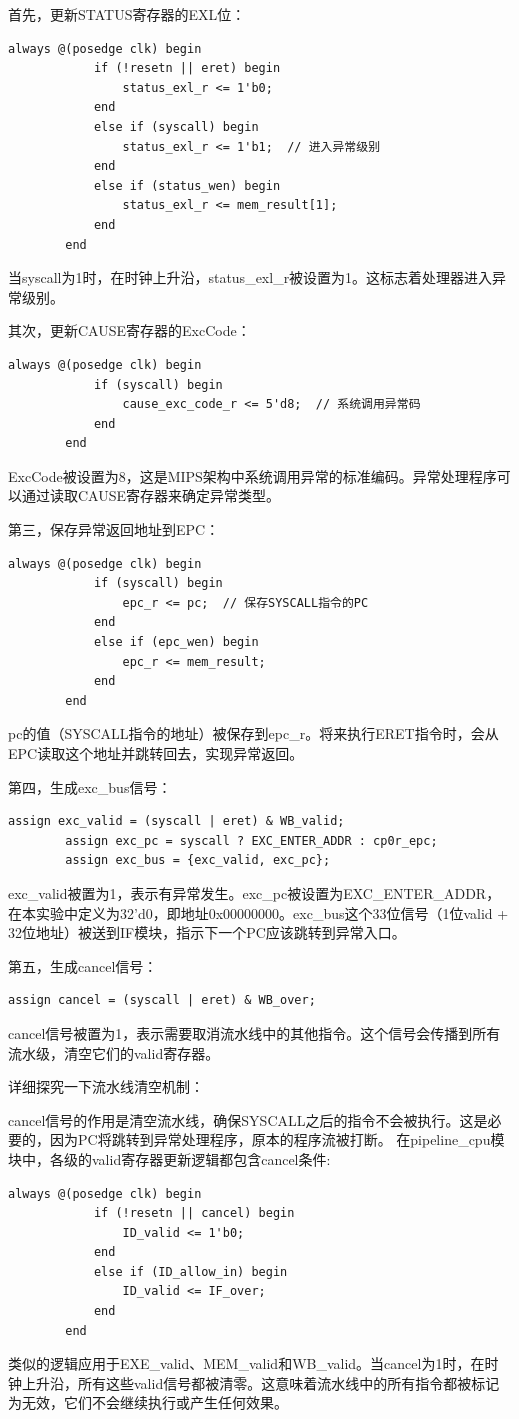 \documentclass[a4paper]{article}
\begin{document}
	首先，更新STATUS寄存器的EXL位：
	\begin{lstlisting}[caption={WB-exl}]
		always @(posedge clk) begin
			if (!resetn || eret) begin
				status_exl_r <= 1'b0;
			end
			else if (syscall) begin
				status_exl_r <= 1'b1;  // 进入异常级别
			end
			else if (status_wen) begin
				status_exl_r <= mem_result[1];
			end
		end
	\end{lstlisting}
	当syscall为1时，在时钟上升沿，status\_exl\_r被设置为1。这标志着处理器进入异常级别。
	
	其次，更新CAUSE寄存器的ExcCode：
	\begin{lstlisting}[caption={WB-exccode}]
		always @(posedge clk) begin
			if (syscall) begin
				cause_exc_code_r <= 5'd8;  // 系统调用异常码
			end
		end
	\end{lstlisting}
	ExcCode被设置为8，这是MIPS架构中系统调用异常的标准编码。异常处理程序可以通过读取CAUSE寄存器来确定异常类型。
	
	第三，保存异常返回地址到EPC：
	\begin{lstlisting}[caption={WB-epc}]
		always @(posedge clk) begin
			if (syscall) begin
				epc_r <= pc;  // 保存SYSCALL指令的PC
			end
			else if (epc_wen) begin
				epc_r <= mem_result;
			end
		end
	\end{lstlisting}
	pc的值（SYSCALL指令的地址）被保存到epc\_r。将来执行ERET指令时，会从EPC读取这个地址并跳转回去，实现异常返回。
	
	第四，生成exc\_bus信号：
	\begin{lstlisting}[caption={WB-excbus}]
		assign exc_valid = (syscall | eret) & WB_valid;
		assign exc_pc = syscall ? EXC_ENTER_ADDR : cp0r_epc;
		assign exc_bus = {exc_valid, exc_pc};
	\end{lstlisting}
	exc\_valid被置为1，表示有异常发生。exc\_pc被设置为EXC\_ENTER\_ADDR，在本实验中定义为32'd0，即地址0x00000000。exc\_bus这个33位信号（1位valid + 32位地址）被送到IF模块，指示下一个PC应该跳转到异常入口。
	
	第五，生成cancel信号：
	\begin{lstlisting}[caption={WB-cancel}]
		assign cancel = (syscall | eret) & WB_over;
	\end{lstlisting}
	cancel信号被置为1，表示需要取消流水线中的其他指令。这个信号会传播到所有流水级，清空它们的valid寄存器。
	
	详细探究一下流水线清空机制：
	
	cancel信号的作用是清空流水线，确保SYSCALL之后的指令不会被执行。这是必要的，因为PC将跳转到异常处理程序，原本的程序流被打断。
	在pipeline\_cpu模块中，各级的valid寄存器更新逻辑都包含cancel条件:
	\begin{lstlisting}[caption={valid-cancel}]
		always @(posedge clk) begin
			if (!resetn || cancel) begin
				ID_valid <= 1'b0;
			end
			else if (ID_allow_in) begin
				ID_valid <= IF_over;
			end
		end
	\end{lstlisting}
	类似的逻辑应用于EXE\_valid、MEM\_valid和WB\_valid。当cancel为1时，在时钟上升沿，所有这些valid信号都被清零。这意味着流水线中的所有指令都被标记为无效，它们不会继续执行或产生任何效果。
	
\end{document}
